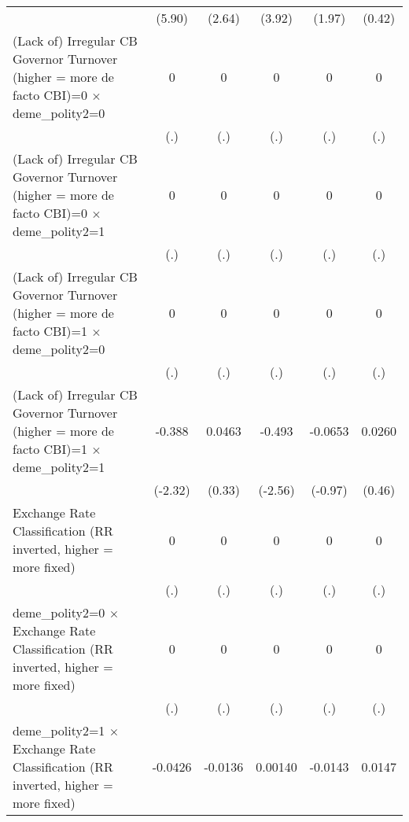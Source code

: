 {\begin{tabular*}{\linewidth}{@{\hskip\tabcolsep\extracolsep\fill}l*{5}{c}}
                &   (5.90)         &   (2.64)         &   (3.92)         &   (1.97)         &   (0.42)         \\
[1em]
(Lack of) Irregular CB Governor Turnover (higher = more de facto CBI)=0 $\times$ deme\_polity2=0&        0         &        0         &        0         &        0         &        0         \\
                &      (.)         &      (.)         &      (.)         &      (.)         &      (.)         \\
[1em]
(Lack of) Irregular CB Governor Turnover (higher = more de facto CBI)=0 $\times$ deme\_polity2=1&        0         &        0         &        0         &        0         &        0         \\
                &      (.)         &      (.)         &      (.)         &      (.)         &      (.)         \\
[1em]
(Lack of) Irregular CB Governor Turnover (higher = more de facto CBI)=1 $\times$ deme\_polity2=0&        0         &        0         &        0         &        0         &        0         \\
                &      (.)         &      (.)         &      (.)         &      (.)         &      (.)         \\
[1em]
(Lack of) Irregular CB Governor Turnover (higher = more de facto CBI)=1 $\times$ deme\_polity2=1&   -0.388\sym{*}  &   0.0463         &   -0.493\sym{*}  &  -0.0653         &   0.0260         \\
                &  (-2.32)         &   (0.33)         &  (-2.56)         &  (-0.97)         &   (0.46)         \\
[1em]
Exchange Rate Classification (RR inverted, higher = more fixed)&        0         &        0         &        0         &        0         &        0         \\
                &      (.)         &      (.)         &      (.)         &      (.)         &      (.)         \\
[1em]
deme\_polity2=0 $\times$ Exchange Rate Classification (RR inverted, higher = more fixed)&        0         &        0         &        0         &        0         &        0         \\
                &      (.)         &      (.)         &      (.)         &      (.)         &      (.)         \\
[1em]
deme\_polity2=1 $\times$ Exchange Rate Classification (RR inverted, higher = more fixed)&  -0.0426\sym{**} &  -0.0136         &  0.00140         &  -0.0143         &   0.0147         \\

\end{tabular*}}
